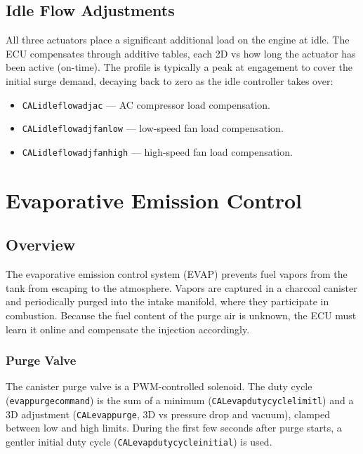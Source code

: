 \documentclass[a4paper,11pt]{article}
\renewcommand{\_}{\oldunderscore\allowbreak}
\begin{document}
\subsection{Idle Flow Adjustments}

All three actuators place a significant additional load on the engine at idle.
The ECU compensates through additive tables, each 2D vs how long
the actuator has been active (on-time). The profile is typically a peak at
engagement to cover the initial surge demand, decaying back to zero as the idle
controller takes over:

\begin{itemize}
\item \texttt{CAL\_idle\_flow\_adj\_ac} --- AC compressor load compensation.
\item \texttt{CAL\_idle\_flow\_adj\_fan\_low} --- low-speed fan load compensation.
\item \texttt{CAL\_idle\_flow\_adj\_fan\_high} --- high-speed fan load compensation.
\end{itemize}

\section{Evaporative Emission Control}

\subsection{Overview}

The evaporative emission control system (EVAP) prevents fuel vapors from the
tank from escaping to the atmosphere. Vapors are captured in a charcoal
canister and periodically purged into the intake manifold, where they
participate in combustion. Because the fuel content of the purge air is
unknown, the ECU must learn it online and compensate the injection accordingly.

\subsubsection*{Purge Valve}

The canister purge valve is a PWM-controlled solenoid. The duty cycle
(\texttt{evap\_purge\_command}) is the sum of a minimum
(\texttt{CAL\_evap\_duty\_cycle\_limit\_l}) and a 3D adjustment
(\texttt{CAL\_evap\_purge}, 3D vs pressure drop and vacuum),
clamped between low and high limits. During the first few seconds after purge
starts, a gentler initial duty cycle (\texttt{CAL\_evap\_duty\_cycle\_initial})
is used.
\end{document}
